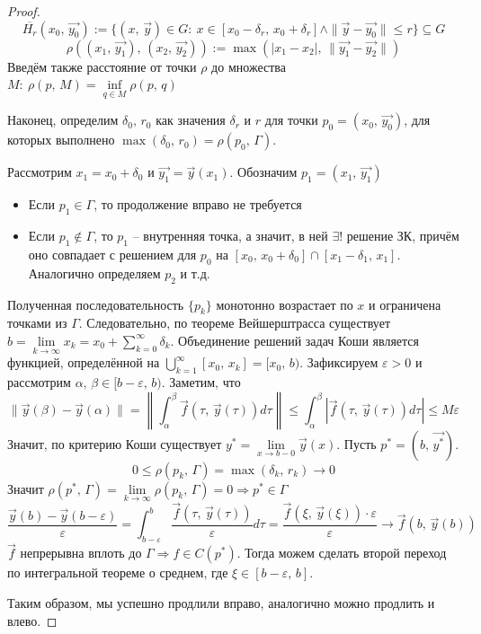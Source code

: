 \documentclass[a4paper,12pt]{article}
\renewcommand{\leq}{\ensuremath{\leqslant}}
\theoremstyle{plain}
\theoremstyle{definition}
\theoremstyle{remark}
\begin{document}
\begin{proof}
	\[\overline{H_r}(x_0,\, \vec{y_0}) := \{(x,\,\vec{y}) \in G:\: x \in [x_0 - \delta_r,\, x_0 + \delta_r] \land \|\vec{y} - \vec{y_0}\| \leq r\} \subseteq G\]
	\[\rho((x_1,\,\vec{y_1}),\, (x_2,\,\vec{y_2})) := \max(|x_1 - x_2|,\, \|\vec{y_1} - \vec{y_2}\|)\]
	Введём также расстояние от точки $\rho$ до множества $M:\: \rho(p,\, M) = \inf\limits_{q \in M} \rho(p,\,q)$

	Наконец, определим $\delta_0,\, r_0$ как значения $\delta_r$ и $r$ для точки $p_0 = (x_0,\,\vec{y_0})$, для которых выполнено $\max(\delta_0,\, r_0) = \rho(p_0,\, \Gamma)$.

	Рассмотрим $x_1 = x_0 + \delta_0$ и $\vec{y_1} = \vec{y}(x_1)$. Обозначим $p_1 = (x_1,\, \vec{y_1})$
	\begin{itemize}
		\item Если $p_1 \in \Gamma$, то продолжение вправо не требуется
		\item Если $p_1 \not\in \Gamma$, то $p_1$ -- внутренняя точка, а значит, в ней $\exists$! решение ЗК, причём оно совпадает с решением для $p_0$ на $[x_0,\, x_0 + \delta_0] \cap [x_1 - \delta_1,\, x_1]$. Аналогично определяем $p_2$ и т.д.
	\end{itemize}

	Полученная последовательность $\{p_k\}$ монотонно возрастает по $x$ и ограничена точками из $\Gamma$. Следовательно, по теореме Вейшерштрасса существует $b = \lim\limits_{k \to \infty} x_k = x_0 + \sum\limits_{k = 0}^\infty \delta_k$. Объединение решений задач Коши является функцией, определённой на $\bigcup\limits_{k = 1}^\infty [x_0,\,x_k] = [x_0,\, b)$. Зафиксируем $\varepsilon > 0$ и рассмотрим $\alpha,\, \beta \in [b - \varepsilon,\, b)$. Заметим, что
	\[\|\vec{y}(\beta) - \vec{y}(\alpha)\| = \left\lVert\int_\alpha^\beta \vec{f}(\tau,\, \vec{y}(\tau))d\tau\right\rVert \leq \int_\alpha^\beta |\vec{f}(\tau,\, \vec{y}(\tau))d\tau| \leq M\varepsilon\]
	Значит, по критерию Коши существует $y^* = \lim\limits_{x \to b - 0} \vec{y}(x)$. Пусть $p^* = (b,\, \vec{y^*})$.
	\[0 \leq \rho(p_k,\, \Gamma) = \max(\delta_k,\, r_k) \to 0\]
	Значит $\rho(p^*,\, \Gamma) = \lim\limits_{k \to \infty}\rho(p_k,\, \Gamma) = 0 \Rightarrow p^* \in \Gamma$
	\[\frac{\vec{y}(b) - \vec{y}(b - \varepsilon)}{\varepsilon} = \int_{b - \varepsilon}^b \frac{\vec{f}(\tau,\, \vec{y}(\tau))}{\varepsilon}d\tau = \frac{\vec{f}(\xi,\, \vec{y}(\xi)) \cdot \varepsilon}{\varepsilon} \to \vec{f}(b,\,\vec{y}(b))\]
	$\vec{f}$ непрерывна вплоть до $\Gamma \Rightarrow f \in C(p^*)$. Тогда можем сделать второй переход по интегральной теореме о среднем, где $\xi \in [b - \varepsilon,\, b]$.

	Таким образом, мы успешно продлили вправо, аналогично можно продлить и влево.
\end{proof}
\end{document}
